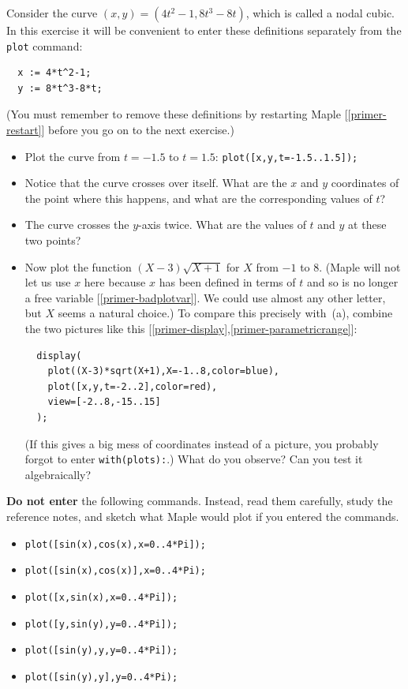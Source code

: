\documentclass[a4paper,10pt]{amsbook}
\begin{document}
\begin{exercise}\label{ex-nodal}
 Consider the curve $(x,y)=(4t^2-1,8t^3-8t)$, which is called a nodal
 cubic.  In this exercise it will be convenient to enter these
 definitions separately from the \verb~plot~ command:
\begin{verbatim}
  x := 4*t^2-1;
  y := 8*t^3-8*t;
\end{verbatim}
 (You must remember to remove these definitions by restarting Maple
 [\ref{primer-restart}] before you go on to the next exercise.) 
 \begin{itemize}
  \item[(a)] Plot the curve from $t=-1.5$ to $t=1.5$:
   \verb~plot([x,y,t=-1.5..1.5]);~  
  \item[(b)] Notice that the curve crosses over itself.  What are the
   $x$ and $y$ coordinates of the point where this happens, and what
   are the corresponding values of $t$? 
  \item[(c)] The curve crosses the $y$-axis twice.  What are the
   values of $t$ and $y$ at these two points? 
  \item[(d)] Now plot the function $(X-3)\sqrt{X+1}$ for $X$ from $-1$
   to $8$.  (Maple will not let us use $x$ here because
   $x$ has been defined in terms of $t$ and so is no longer a free
   variable [\ref{primer-badplotvar}].  We could use almost any
   other letter, but $X$ seems a  natural choice.)  To
   compare this precisely with~(a), combine the two pictures
   like this [\ref{primer-display},\ref{primer-parametricrange}]: 
\begin{verbatim}
  display(
    plot((X-3)*sqrt(X+1),X=-1..8,color=blue),
    plot([x,y,t=-2..2],color=red),
    view=[-2..8,-15..15]     
  );
\end{verbatim}
   (If this gives a big mess of coordinates instead of a picture, you
   probably forgot to enter \verb~with(plots):~.) 
   What do you observe?  Can you test it algebraically? 
 \end{itemize}
\end{exercise}

\begin{exercise}
 \textbf{Do not enter} the following commands.  Instead, read them
 carefully, study the reference notes, and sketch what Maple would
 plot if you entered the commands.
 \begin{itemize}
  \item[(a)] \verb~plot([sin(x),cos(x),x=0..4*Pi]);~
  \item[(b)] \verb~plot([sin(x),cos(x)],x=0..4*Pi);~
  \item[(c)] \verb~plot([x,sin(x),x=0..4*Pi]);~
  \item[(d)] \verb~plot([y,sin(y),y=0..4*Pi]);~
  \item[(e)] \verb~plot([sin(y),y,y=0..4*Pi]);~
  \item[(e)] \verb~plot([sin(y),y],y=0..4*Pi);~
 \end{itemize}
\end{exercise}
\end{document}
